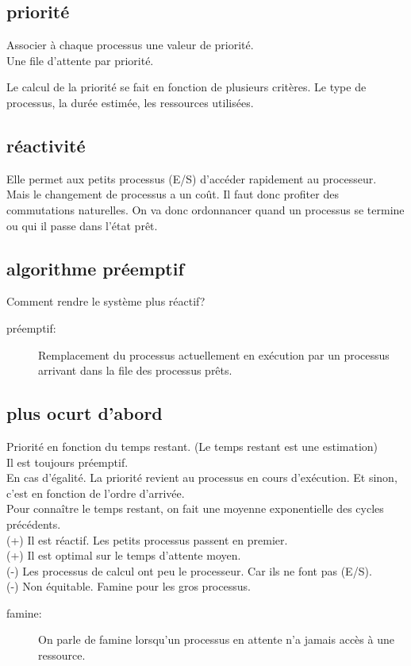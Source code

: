 \documentclass[a4paper, 9pt]{article}
\begin{document}
        \subsection{priorité}
            \begin{description}[style=nextline]
                \item[priorité:]
                    Associer à chaque processus une valeur de priorité.\\
                    Une file d'attente par priorité.
            \end{description}
            Le calcul de la priorité se fait en fonction de plusieurs critères. Le type de processus, la durée estimée, les ressources utilisées.
        \subsection{réactivité}
            Elle permet aux petits processus (E/S) d'accéder rapidement au processeur.\\
            Mais le changement de processus a un coût. Il faut donc profiter des commutations naturelles. On va donc ordonnancer quand un processus se 
            termine ou qui il passe dans l'état prêt.
        \subsection{algorithme préemptif}
            Comment rendre le système plus réactif?
            \begin{description}
                \item[préemptif:] Remplacement du processus actuellement en exécution par un processus arrivant dans la file des processus prêts.
            \end{description}
        \subsection{plus ocurt d'abord}
            Priorité en fonction du temps restant. (Le temps restant est une estimation)\\
            Il est toujours préemptif.\\
            En cas d'égalité. La priorité revient au processus en cours d'exécution. Et sinon, c'est en fonction de l'ordre d'arrivée.\\
            Pour connaître le temps restant, on fait une moyenne exponentielle des cycles précédents.\\
            (+) Il est réactif. Les petits processus passent en premier.\\
            (+) Il est optimal sur le temps d'attente moyen.\\
            (-) Les processus de calcul ont peu le processeur. Car ils ne font pas (E/S).\\
            (-) Non équitable. Famine pour les gros processus.
            \begin{description}
                \item[famine:] On parle de famine lorsqu’un processus en attente n’a jamais accès à une ressource.
            \end{description}
\end{document}
